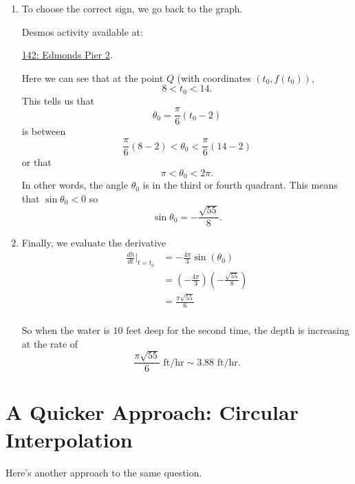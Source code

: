 \documentclass{ximera}
\begin{document}
\begin{example}
\begin{enumerate}
\item To choose the correct sign, we go back to the graph.

Desmos activity available at:

\href{https://www.desmos.com/calculator/fs9xy1lf0e}{142: Edmonds Pier 2}.

 
\begin{onlineOnly}
    \begin{center}
\end{center}
\end{onlineOnly}

Here we can see that at the point $Q$ (with coordinates $(t_0, f(t_0))$, 
\[
          8 < t_0 < 14.
\]  
This tells us that 
\[
 \theta_ 0 =  \frac{\pi}{6} \left( t_0 - 2 \right)
\]
is between
\[
       \frac{\pi}{6} \left(8 - 2 \right)  <   \theta_0  < \frac{\pi}{6} \left(14 - 2 \right)
\]
or that
\[
     \pi < \theta_0 < 2\pi .
\]  
In other words, the angle $\theta_0$ is in the third or fourth quadrant. This means that $\sin\theta_0 < 0$ so 
\[
 \sin\theta_0 = - \frac{\sqrt{55}}{8} .
\]

\item Finally, we evaluate the derivative
\begin{align*}
 \frac{dh}{dt}\Big|_{t=t_0} &=-\frac{4\pi}{3} \sin\left( \theta_0   \right)  \\
                                         & = \left(- \frac{4\pi}{3}\right)  \left( - \frac{\sqrt{55}}{8} \right) \\
                                        &= \frac{\pi \sqrt{55}}{6} \\
\end{align*}

So when the water is $10$ feet deep for the second time, the depth is increasing at the rate of 
\[
  \frac{\pi \sqrt{55}}{6} \text{ ft/hr} \sim 3.88\text{ ft/hr} .
\]

\end{enumerate}
\end{example}


\section{A Quicker Approach: Circular Interpolation}

Here's another approach to the same question.
\end{document}
